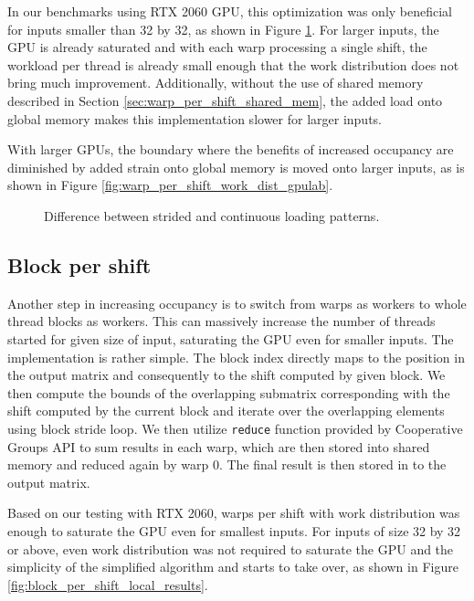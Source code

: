 In our benchmarks using RTX 2060 GPU, this optimization was only beneficial for inputs smaller than 32 by 32, as shown in Figure \ref{fig:warp_per_shift_work_dist_local_results}. For larger inputs, the GPU is already saturated and with each warp processing a single shift, the workload per thread is already small enough that the work distribution does not bring much improvement. Additionally, without the use of shared memory described in Section \ref{sec:warp_per_shift_shared_mem}, the added load onto global memory makes this implementation slower for larger inputs.

With larger GPUs, the boundary where the benefits of increased occupancy are diminished by added strain onto global memory is moved onto larger inputs, as is shown in Figure \ref{fig:warp_per_shift_work_dist_gpulab}. %


\begin{figure}[ht]
	\centering
	\def\svgwidth{0.6\textwidth}
	
	\caption{Difference between strided and continuous loading patterns.}
	\label{fig:warp_per_shift_work_dist_local_results}
\end{figure}



\subsection{Block per shift}

Another step in increasing occupancy is to switch from warps as workers to whole thread blocks as workers. This can massively increase the number of threads started for given size of input, saturating the GPU even for smaller inputs.
The implementation is rather simple. The block index directly maps to the position in the output matrix and consequently to the shift computed by given block. We then compute the bounds of the overlapping submatrix corresponding with the shift computed by the current block and iterate over the overlapping elements using block stride loop. We then utilize \texttt{reduce} function provided by Cooperative Groups API to sum results in each warp, which are then stored into shared memory and  reduced again by warp 0. The final result is then stored in to the output matrix.

Based on our testing with RTX 2060, warps per shift with work distribution was enough to saturate the GPU even for smallest inputs. For inputs of size 32 by 32 or above, even work distribution was not required to saturate the GPU and the simplicity of the simplified algorithm and starts to take over, as shown in Figure \ref{fig:block_per_shift_local_results}. 

